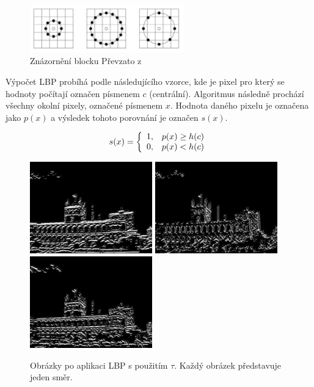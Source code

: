 \documentclass[czech,BP]{thesiskiv}
\begin{document}
\begin{figure}[H]
		\centering
		\includegraphics[width=253px]{./img/znazorneni_lbp.png}	
		\caption{Znázornění blocku Převzato z \cite{SrovnaniDeskriptoru}}
\end{figure}

\par Výpočet LBP probíhá podle následujícího vzorce, kde je pixel pro který se hodnoty počítají označen písmenem $c$ (centrální). Algoritmus následně prochází všechny okolní pixely, označené písmenem  $x$. Hodnota daného pixelu je označena jako $p(x)$ a výsledek tohoto porovnání je označen $s(x)$.

\begin{displaymath} 
	\label{asd2} 
		    s(x) = \left\{ \begin{array}{r@{\quad}c}
    		1, & p(x) \geq h(c) \\
    		0, & p(x) < h(c) \\ \end{array} \right. 
\end{displaymath}

\begin{figure}[ht]
	\centering
	\includegraphics[width=150pt]{./img/lbp1_tau.jpg}
	\includegraphics[width=150pt]{./img/lbp2_tau.jpg}
	\includegraphics[width=150pt]{./img/lbp3_tau.jpg}
	\caption{Obrázky po aplikaci LBP s použitím $\tau$. Každý obrázek představuje jeden směr.}
\end{figure}
\end{document}
